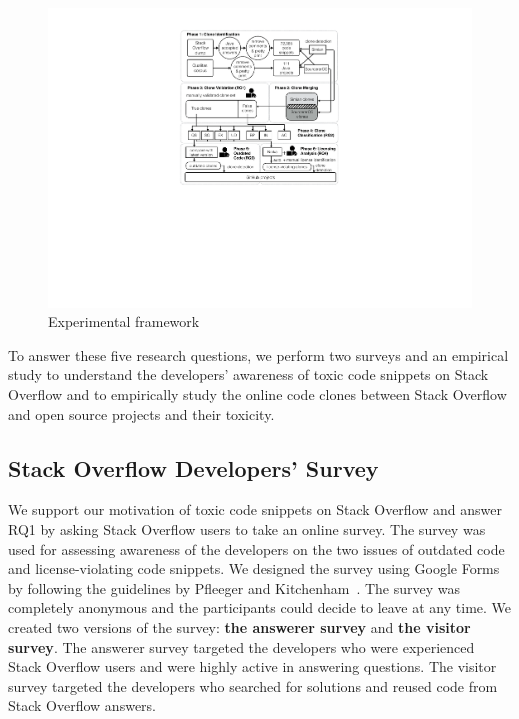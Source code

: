 \documentclass[10pt,journal,compsoc]{IEEEtran}
\begin{document}
\begin{figure}
	\centering
	\includegraphics[width=\linewidth]{exp_framework_new}
	\caption{Experimental framework}
	\label{fig:exp_framework}
\end{figure}

To answer these five research questions, we perform two surveys and an empirical study to
understand the developers' awareness of toxic code snippets on Stack Overflow and to
empirically study the online code clones between Stack Overflow and open source
projects and their toxicity. 

\subsection{Stack Overflow Developers' Survey} We support our motivation of
toxic code snippets on Stack Overflow and answer RQ1 by asking Stack
Overflow users to take an online survey. The survey was used for assessing awareness of
the developers on the two issues of outdated code and license-violating code
snippets. We designed the survey using Google Forms by following the guidelines by Pfleeger and
Kitchenham~\cite{Pfleeger2001,Kitchenham2002}. The survey was completely
anonymous and the participants could decide to leave at any time. 
We created two versions of the survey: \textbf{the answerer survey} and \textbf{the visitor survey}.
The answerer survey targeted the developers who were experienced Stack Overflow users
and were highly active in answering questions. The visitor survey
targeted the developers who searched for solutions and reused code from Stack Overflow answers.
\end{document}
